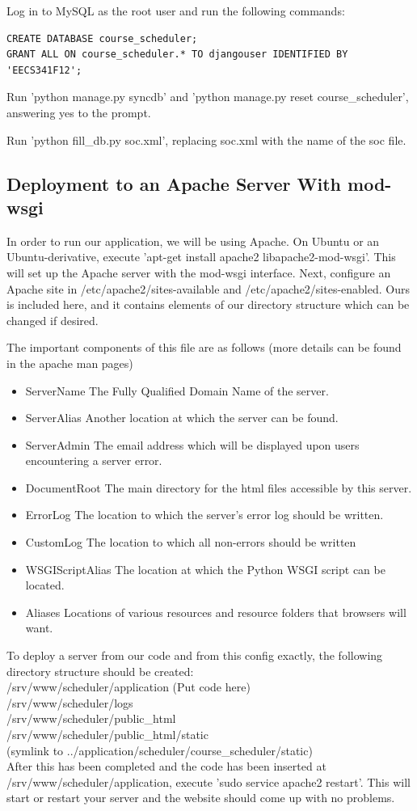 \documentclass[pdftex,12pt,letter]{article}
\begin{document}
Log in to MySQL as the root user and run the following commands:

\begin{verbatim}
CREATE DATABASE course_scheduler;
GRANT ALL ON course_scheduler.* TO djangouser IDENTIFIED BY 'EECS341F12';
\end{verbatim}

Run 'python manage.py syncdb' and 'python manage.py reset course\_scheduler', answering yes to the prompt.

Run 'python fill\_db.py soc.xml', replacing soc.xml with the name of the soc file.

\subsection{Deployment to an Apache Server With mod-wsgi}
In order to run our application, we will be using Apache. On Ubuntu or an Ubuntu-derivative, execute 'apt-get install apache2 libapache2-mod-wsgi'. This will set up the Apache server with the mod-wsgi interface. Next, configure an Apache site in /etc/apache2/sites-available and /etc/apache2/sites-enabled. Ours is included here, and it contains elements of our directory structure which can be changed if desired.

The important components of this file are as follows (more details can be found in the apache man pages)
\begin{itemize}
\item ServerName
\subitem The Fully Qualified Domain Name of the server.
\item ServerAlias
\subitem Another location at which the server can be found.
\item ServerAdmin
\subitem The email address which will be displayed upon users encountering a server error.
\item DocumentRoot
\subitem The main directory for the html files accessible by this server.
\item ErrorLog
\subitem The location to which the server's error log should be written.
\item CustomLog
\subitem The location to which all non-errors should be written
\item WSGIScriptAlias
\subitem The location at which the Python WSGI script can be located.
\item Aliases
\subitem Locations of various resources and resource folders that browsers will want.
\end{itemize}
To deploy a server from our code and from this config exactly, the following directory structure should be created:\\
/srv/www/scheduler/application (Put code here)\\
/srv/www/scheduler/logs\\
/srv/www/scheduler/public\_html\\
/srv/www/scheduler/public\_html/static\\
(symlink to ../application/scheduler/course\_scheduler/static)\\
After this has been completed and the code has been inserted at /srv/www/scheduler/application, execute 'sudo service apache2 restart'. This will start or restart your server and the website should come up with no problems.
\end{document}
